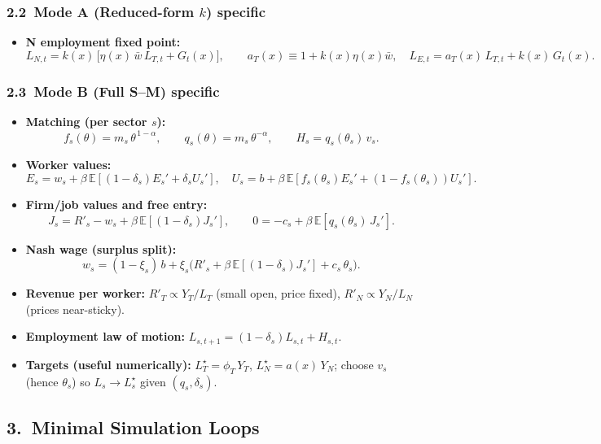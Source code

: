 \subsubsection*{2.2\ Mode A (Reduced-form $k$) specific}
\begin{itemize}
	\setcounter{enumi}{6}
	\item \textbf{N employment fixed point:}
	\[
	L_{N,t}=k(x)\,\big[\eta(x)\,\bar w\,L_{T,t}+G_t(x)\big],\qquad
	a_T(x)\equiv 1+k(x)\eta(x)\bar w,\quad
	L_{E,t}=a_T(x)\,L_{T,t}+k(x)\,G_t(x).
	\]
\end{itemize}

\subsubsection*{2.3\ Mode B (Full S--M) specific}
\begin{itemize}
	\setcounter{enumi}{7}
	\item \textbf{Matching (per sector $s$):}
	\[
	f_s(\theta)=m_s\,\theta^{\,1-\alpha},\qquad
	q_s(\theta)=m_s\,\theta^{-\alpha},\qquad
	H_s=q_s(\theta_s)\,v_s.
	\]
	\item \textbf{Worker values:}
	\[
	E_s=w_s+\beta\,\mathbb{E}[(1-\delta_s)E_s'+\delta_s U_s'],\quad
	U_s=b+\beta\,\mathbb{E}[f_s(\theta_s)E_s'+(1-f_s(\theta_s))U_s'].
	\]
	\item \textbf{Firm/job values and free entry:}
	\[
	J_s=R'_s-w_s+\beta\,\mathbb{E}[(1-\delta_s)J_s'],\qquad
	0=-c_s+\beta\,\mathbb{E}[q_s(\theta_s)\,J_s'].
	\]
	\item \textbf{Nash wage (surplus split):}
	\[
	w_s=(1-\xi_s)\,b+\xi_s\Big(R'_s+\beta\,\mathbb{E}[(1-\delta_s)J_s']+c_s\,\theta_s\Big).
	\]
	\item \textbf{Revenue per worker:}\; $R'_T\propto Y_T/L_T$ (small open, price fixed),\; $R'_N\propto Y_N/L_N$ (prices near-sticky).
	\item \textbf{Employment law of motion:}\; $L_{s,t+1}=(1-\delta_s)L_{s,t}+H_{s,t}$.
	\item \textbf{Targets (useful numerically):}\; $L_T^\star=\phi_T\,Y_T$,\; $L_N^\star=a(x)\,Y_N$; choose $v_s$ (hence $\theta_s$) so $L_s\to L_s^\star$ given $(q_s,\delta_s)$.
\end{itemize}

\subsection*{3.\ Minimal Simulation Loops}

